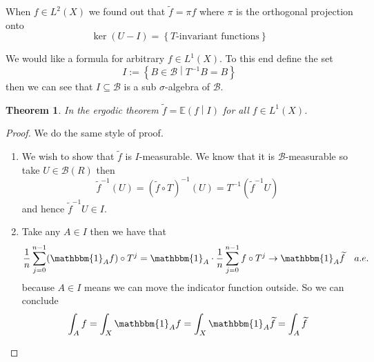 \documentclass[11pt]{article}
\newcommand{\defeq}{:=}
\newcommand{\indic}[1]{\mathbbm{1}_{#1}}
\newcommand{\relmiddle}[1]{\mathrel{}\middle#1\mathrel{}}
\newcommand{\rmv}{\relmiddle|}
\newcommand{\gvn}[2]{\ensuremath{\left(#1\rmv#2\right)}}
\newcommand{\expg}[2]{\ensuremath{\mathbb{E}\gvn{#1}{#2}}}
\newtheorem{theorem}[prop]{Theorem}
\begin{document}
When $f\in L^2(X)$ we found out that $\widetilde{f}=\pi f$ where $\pi$ is the orthogonal projection onto
\[
\ker(U - I) = \left\{ T\text{-invariant functions} \right\}
\]

We would like a formula for arbitrary $f\in L^1(X)$.
To this end define the set
\[
	I \defeq \left\{ B\in \mathcal{B} \rmv T^{-1}B = B\right\}
\]
then we can see that $I\subseteq\mathcal{B}$ is a sub $\sigma$-algebra of $\mathcal{B}$.

\begin{theorem}
In the ergodic theorem $\widetilde{f}= \expg{f}{I}$ for all $f\in L^1(X)$.
\end{theorem}

\begin{proof}
We do the same style of proof.
\begin{enumerate}[label=(\roman*)]
	\item We wish to show that $\widetilde{f}$ is $I$-measurable.
		We know that it is $\mathcal{B}$-measurable so take $U\in\mathcal{B}(R)$ then
		\[
			\widetilde{f}^{-1}(U) = (\widetilde{f}\circ T)^{-1}(U) = T^{-1}(\widetilde{f}^{-1}U)
		\]
		and hence $\widetilde{f}^{-1}U\in I$.
	\item Take any $A\in I$ then we have that
		\[
			\frac{1}{n}\sum_{j=0}^{n-1}(\indic{A} f ) \circ T^j = \indic{A} \cdot \frac{1}{n}\sum_{j=0}^{n-1}f \circ T^j \to \indic{A} \widetilde{f}\quad a.e.
		\]
		because $A\in I$ means we can move the indicator function outside.
		So we can conclude
		\[
			\int_A f = \int_X \indic{A} f = \int_X \indic{A}\widetilde{f} = \int_A \widetilde{f}
		\]
\end{enumerate}
\end{proof}
\end{document}
